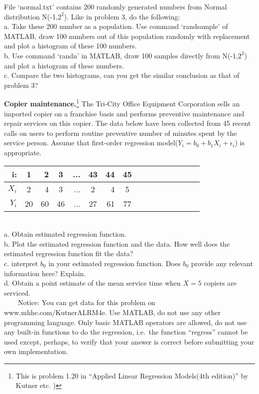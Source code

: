 \documentclass[12pt]{article}
\begin{document}
 { File `normal.txt' contains 200
randomly
generated numbers from Normal distribution N(-1,$2^2$). Like in problem 3, do the following: \\
a. Take these 200 number as a population. Use command `randsample'
of MATLAB, draw 100 numbers out of this population randomly with
replacement and plot a histogram of
these 100 numbers.\\
b. Use command `randn' in MATLAB, draw 100 samples directly from
N(-1,$2^2$) and plot a histogram of these numbers.\\
c. Compare the two histograms, can you get the similar conclusion as
that of problem 3?}
 { \vfill
  \answer
} { }



 { \textbf{Copier maintenance.}\footnote[1]{This is
problem 1.20 in ``Applied Linear Regression Models(4th edition)'' by
Kutner etc. )} The Tri-City Office Equipment Corporation sells an
imported copier on a franchise basis and performs preventive
maintenance and repair services on this copier. The data below have
been collected from 45 recent calls on users to perform routine
preventive number of minutes spent by the service person. Assume
that first-order regression model($Y_i=b_0+b_1 X_i+\epsilon_i$) is
appropriate.
\begin{table}[htdp]
\begin{center}
\begin{tabular}{rcrcrcrcrcrcrcrc}
\textbf{i:} &\textbf{1} &\textbf{2}& \textbf{3}&...&\textbf{43}&\textbf{44}&\textbf{45}\\
\hline \textbf{$X_i$} &2 &4 &3 &... &2 &4 &5\\
\textbf{$Y_i$} &20 &60 &46 &... &27 &61 &77
\end{tabular}
\end{center}
\end{table}\\

a. Obtain estimated regression function.\\
b. Plot the estimated regression function and the data. How well
does the estimated regression function fit the data?\\
c. interpret $b_0$ in your estimated regression function. Does $b_0$
provide any relevant information here? Explain.\\
d. Obtain a point estimate of the mean service time when $X=5$
copiers are serviced.\\
\indent~~~~Notice: You can get data for this problem on
www.mhhe.com/KutnerALRM4e. Use MATLAB, do not
use any other programming language. Only basic MATLAB operators are
allowed, do not use any built-in functions to do the regression, i.e.~the function ``regress'' cannot be used except, perhaps, to verify that your answer is correct before submitting your own implementation. \\}
 { \vfill
  \answer
} { }



\problemsdone
\end{document}
